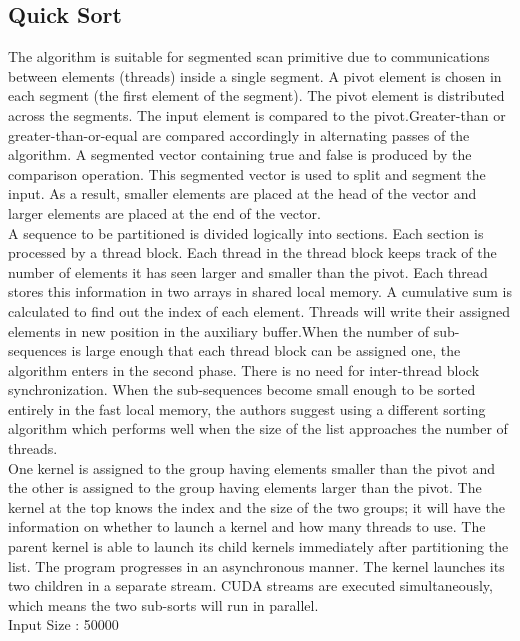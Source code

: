 \documentclass[conference]{IEEEtran}
\begin{document}
\subsection{Quick Sort}
The algorithm is suitable for segmented
scan primitive due to communications between elements (threads) inside a
single segment. A pivot element is chosen in each segment (the first element of the
segment). The pivot element is distributed across the segments. The input element is
compared to the pivot.Greater-than or greater-than-or-equal are compared accordingly
in alternating passes of the algorithm. A segmented vector containing true and false
is produced by the comparison operation. This segmented vector is used to split and segment the input. As a result, smaller elements are placed at the head of the vector
and larger elements are placed at the end of the vector. \\

A sequence to be partitioned is divided logically into sections. Each section is
processed by a thread block. Each thread in the thread block keeps track of the number
of elements it has seen larger and smaller than the pivot. Each thread stores this
information in two arrays in shared local memory. A cumulative sum is calculated to
find out the index of each element. Threads will write their assigned elements in new
position in the auxiliary buffer.When the number of sub-sequences is large enough that
each thread block can be assigned one, the algorithm enters in the second phase. There
is no need for inter-thread block synchronization. When the sub-sequences become
small enough to be sorted entirely in the fast local memory, the authors suggest using
a different sorting algorithm which performs well when the size of the list approaches
the number of threads.\\

One kernel is assigned to the group having elements smaller than the pivot
and the other is assigned to the group having elements larger than the pivot. The kernel
at the top knows the index and the size of the two groups; it will have the information
on whether to launch a kernel and how many threads to use. The parent kernel is able to
launch its child kernels immediately after partitioning the list. The program progresses
in an asynchronous manner. The kernel launches its two children in a separate stream.
CUDA streams are executed simultaneously, which means the two sub-sorts will run
in parallel.\\

Input Size : 50000 
\end{document}
